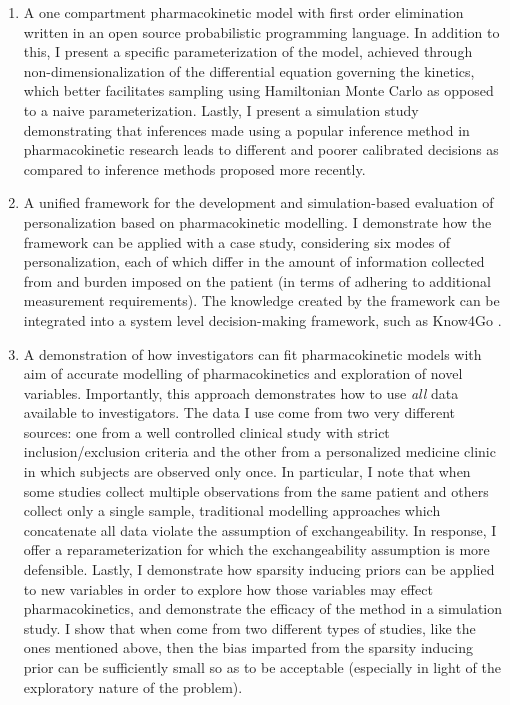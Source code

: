 \begin{enumerate}
	\item  A one compartment pharmacokinetic model with first order elimination written in an open source probabilistic programming language.  In addition to this, I present a specific parameterization of the model, achieved through non-dimensionalization of the differential equation governing the kinetics, which better facilitates sampling using Hamiltonian Monte Carlo as opposed to a naive parameterization.  Lastly, I present a simulation study demonstrating that inferences made using a popular inference method in pharmacokinetic research leads to different and poorer calibrated decisions as compared to inference methods proposed more recently.
	
	\item A unified framework for the development and simulation-based evaluation of personalization based on pharmacokinetic modelling. I demonstrate how the framework can be applied with a case study, considering six modes of personalization, each of which differ in the amount of information collected from  and burden imposed on the patient (in terms of adhering to additional measurement requirements).  The knowledge created by the framework can be integrated into a system level decision-making framework, such as Know4Go \cite{Martin2016}.  
	
	\item A demonstration of how investigators can fit pharmacokinetic models with aim of accurate modelling of pharmacokinetics and exploration of novel variables.  Importantly, this approach demonstrates how to use \textit{all} data available to investigators.  The data I use come from two very different sources:  one from a well controlled clinical study with strict inclusion/exclusion criteria and the other from a personalized medicine clinic in which subjects are observed only once. In particular, I note that when some studies collect multiple observations from the same patient and others collect only a single sample, traditional modelling approaches which concatenate all data violate the assumption of exchangeability. In response, I offer a reparameterization for which the exchangeability assumption is more defensible.  Lastly, I demonstrate how sparsity inducing priors can be applied to new variables in order to explore how those variables may effect pharmacokinetics, and demonstrate the efficacy of the method in a simulation study.  I show that when come from two different types of studies, like the ones mentioned above, then the bias imparted from the sparsity inducing prior can be sufficiently small so as to be acceptable (especially in light of the exploratory nature of the problem). 
\end{enumerate}

